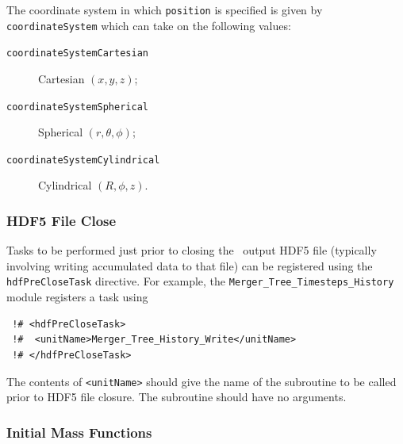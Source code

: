 The coordinate system in which {\tt position} is specified is given by {\tt coordinateSystem} which can take on the following values:
\begin{description}
 \item [{\tt coordinateSystemCartesian}] Cartesian $(x,y,z)$;
 \item [{\tt coordinateSystemSpherical}] Spherical $(r,\theta,\phi)$;
 \item [{\tt coordinateSystemCylindrical}] Cylindrical $(R,\phi,z)$.
\end{description}

\subsubsection{HDF5 File Close}

Tasks to be performed just prior to closing the \glc\ output HDF5 file (typically involving writing accumulated data to that file) can be registered using the {\tt hdfPreCloseTask} directive. For example, the {\tt Merger\_Tree\_Timesteps\_History} module registers a task using
\begin{verbatim}
 !# <hdfPreCloseTask>
 !#  <unitName>Merger_Tree_History_Write</unitName>
 !# </hdfPreCloseTask>
\end{verbatim}
The contents of {\tt <unitName>} should give the name of the subroutine to be called prior to HDF5 file closure. The subroutine should have no arguments.

\subsubsection{Initial Mass Functions}

